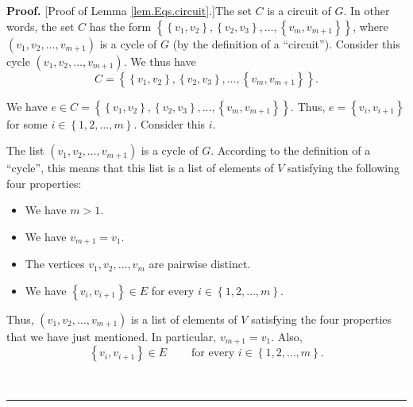 \documentclass[numbers=enddot,12pt,final,onecolumn,notitlepage]{scrartcl}%
\theoremstyle{definition}
\newenvironment{proof}[1][Proof]{\noindent\textbf{#1.} }{\ \rule{0.5em}{0.5em}}
\newenvironment{verlong}{}{}
\begin{document}
\begin{verlong}
\begin{proof}
[Proof of Lemma \ref{lem.Eqs.circuit}.]The set $C$ is a circuit of $G$. In
other words, the set $C$ has the form $\left\{  \left\{  v_{1},v_{2}\right\}
,\left\{  v_{2},v_{3}\right\}  ,\ldots,\left\{  v_{m},v_{m+1}\right\}
\right\}  $, where $\left(  v_{1},v_{2},\ldots,v_{m+1}\right)  $ is a cycle of
$G$ (by the definition of a \textquotedblleft circuit\textquotedblright).
Consider this cycle $\left(  v_{1},v_{2},\ldots,v_{m+1}\right)  $. We thus
have
\begin{equation}
C=\left\{  \left\{  v_{1},v_{2}\right\}  ,\left\{  v_{2},v_{3}\right\}
,\ldots,\left\{  v_{m},v_{m+1}\right\}  \right\}  .
\label{pf.lem.Eqs.circuit.1}%
\end{equation}


We have $e\in C=\left\{  \left\{  v_{1},v_{2}\right\}  ,\left\{  v_{2}%
,v_{3}\right\}  ,\ldots,\left\{  v_{m},v_{m+1}\right\}  \right\}  $. Thus,
$e=\left\{  v_{i},v_{i+1}\right\}  $ for some $i\in\left\{  1,2,\ldots
,m\right\}  $. Consider this $i$.

The list $\left(  v_{1},v_{2},\ldots,v_{m+1}\right)  $ is a cycle of $G$.
According to the definition of a \textquotedblleft cycle\textquotedblright,
this means that this list is a list of elements of $V$ satisfying the
following four properties:

\begin{itemize}
\item We have $m>1$.

\item We have $v_{m+1}=v_{1}$.

\item The vertices $v_{1},v_{2},\ldots,v_{m}$ are pairwise distinct.

\item We have $\left\{  v_{i},v_{i+1}\right\}  \in E$ for every $i\in\left\{
1,2,\ldots,m\right\}  $.
\end{itemize}

Thus, $\left(  v_{1},v_{2},\ldots,v_{m+1}\right)  $ is a list of elements of
$V$ satisfying the four properties that we have just mentioned. In particular,
$v_{m+1}=v_{1}$. Also,%
\begin{equation}
\left\{  v_{i},v_{i+1}\right\}  \in E\ \ \ \ \ \ \ \ \ \ \text{for every }%
i\in\left\{  1,2,\ldots,m\right\}  . \label{pf.lem.Eqs.circuit.inE}%
\end{equation}



\end{proof}
\end{verlong}
\end{document}
